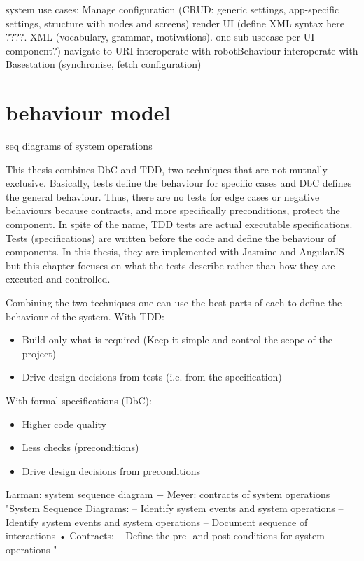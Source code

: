 system use cases:
Manage configuration (CRUD: generic settings, app-specific settings, structure with nodes and screens)
render UI (define XML syntax here ????. XML (vocabulary, grammar, motivations). one sub-usecase per UI component?)
navigate to URI
interoperate with robotBehaviour 
interoperate with Basestation (synchronise, fetch configuration)

\section{behaviour model}
seq diagrams of system operations

This thesis combines \ac{DbC} and \ac{TDD}, two techniques that are not mutually exclusive.
Basically, tests define the behaviour for specific cases and \ac{DbC} defines the general behaviour. 
Thus, there are no tests for edge cases or negative behaviours because contracts, and more specifically preconditions, protect the component.
In spite of the name, \ac{TDD} tests are actual executable specifications.
Tests (specifications) are written before the code and define the behaviour of components.
In this thesis, they are implemented with Jasmine and AngularJS but this chapter focuses on what the tests describe rather than how they are executed and controlled.

Combining the two techniques one can use the best parts of each to define the behaviour of the system.
With \ac{TDD}:
\begin{itemize}
    \item Build only what is required (Keep it simple and control the scope of the project)
    \item Drive design decisions from tests (i.e. from the specification)
\end{itemize}

With formal specifications (\ac{DbC}):
\begin{itemize}
    \item Higher code quality
    \item Less checks (preconditions)
    \item Drive design decisions from preconditions
\end{itemize}


Larman: system sequence diagram + Meyer: contracts of system operations
"System Sequence Diagrams:
–
Identify system events and system operations
–
Identify system events and system operations
– Document sequence of interactions
• Contracts:
– Define the pre- and post-conditions for system
operations "





